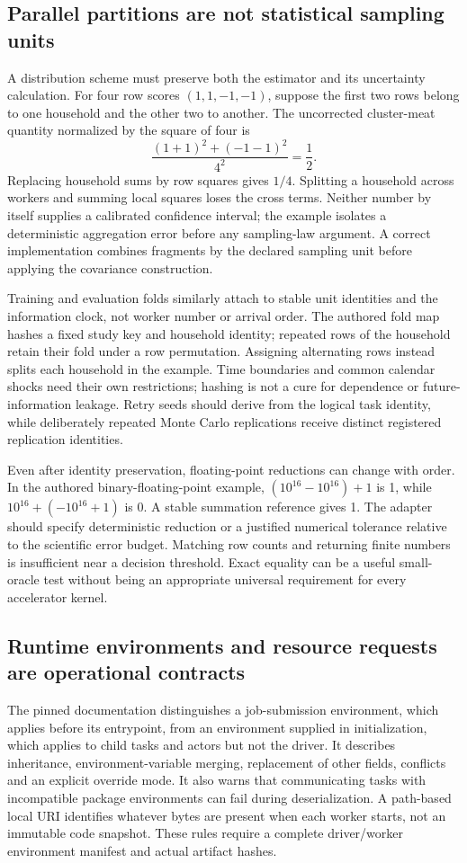 \subsection{Parallel partitions are not statistical sampling units}
A distribution scheme must preserve both the estimator and its uncertainty calculation. For four row scores $(1,1,-1,-1)$, suppose the first two rows belong to one household and the other two to another. The uncorrected cluster-meat quantity normalized by the square of four is
\[
 \frac{(1+1)^2+(-1-1)^2}{4^2}=\frac12.
\]
Replacing household sums by row squares gives $1/4$. Splitting a household across workers and summing local squares loses the cross terms. Neither number by itself supplies a calibrated confidence interval; the example isolates a deterministic aggregation error before any sampling-law argument. A correct implementation combines fragments by the declared sampling unit before applying the covariance construction.~\citep{exec24_ray_contract}

Training and evaluation folds similarly attach to stable unit identities and the information clock, not worker number or arrival order. The authored fold map hashes a fixed study key and household identity; repeated rows of the household retain their fold under a row permutation. Assigning alternating rows instead splits each household in the example. Time boundaries and common calendar shocks need their own restrictions; hashing is not a cure for dependence or future-information leakage. Retry seeds should derive from the logical task identity, while deliberately repeated Monte Carlo replications receive distinct registered replication identities.

Even after identity preservation, floating-point reductions can change with order. In the authored binary-floating-point example, $(10^{16}-10^{16})+1$ is 1, while $10^{16}+(-10^{16}+1)$ is 0. A stable summation reference gives 1. The adapter should specify deterministic reduction or a justified numerical tolerance relative to the scientific error budget. Matching row counts and returning finite numbers is insufficient near a decision threshold. Exact equality can be a useful small-oracle test without being an appropriate universal requirement for every accelerator kernel.~\citep{exec24_ray_contract}

\subsection{Runtime environments and resource requests are operational contracts}
The pinned documentation distinguishes a job-submission environment, which applies before its entrypoint, from an environment supplied in initialization, which applies to child tasks and actors but not the driver. It describes inheritance, environment-variable merging, replacement of other fields, conflicts and an explicit override mode. It also warns that communicating tasks with incompatible package environments can fail during deserialization. A path-based local URI identifies whatever bytes are present when each worker starts, not an immutable code snapshot. These rules require a complete driver/worker environment manifest and actual artifact hashes.~\citep{exec24_ray_sources}

